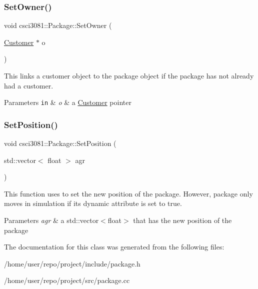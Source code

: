 \subsubsection{\texorpdfstring{Set\+Owner()}{SetOwner()}}
{\footnotesize\ttfamily void csci3081\+::\+Package\+::\+Set\+Owner (\begin{DoxyParamCaption}\item[{\hyperlink{classcsci3081_1_1Customer}{Customer} $\ast$}]{o }\end{DoxyParamCaption})}



This links a customer object to the package object if the package has not already had a customer. 


\begin{DoxyParams}[1]{Parameters}
\mbox{\tt in}  & {\em o} & a \hyperlink{classcsci3081_1_1Customer}{Customer} pointer \\
\hline
\end{DoxyParams}
\mbox{\label{classcsci3081_1_1Package_afc467e1989fa6d08182e22006afcc9cd}} 
\subsubsection{\texorpdfstring{Set\+Position()}{SetPosition()}}
{\footnotesize\ttfamily void csci3081\+::\+Package\+::\+Set\+Position (\begin{DoxyParamCaption}\item[{std\+::vector$<$ float $>$}]{agr }\end{DoxyParamCaption})}



This function uses to set the new position of the package. However, package only moves in simulation if its dynamic attribute is set to true. 


\begin{DoxyParams}{Parameters}
{\em agr} & a std\+::vector$<$float$>$ that has the new position of the package \\
\hline
\end{DoxyParams}


The documentation for this class was generated from the following files\+:\begin{DoxyCompactItemize}
\item 
/home/user/repo/project/include/package.\+h\item 
/home/user/repo/project/src/package.\+cc\end{DoxyCompactItemize}
